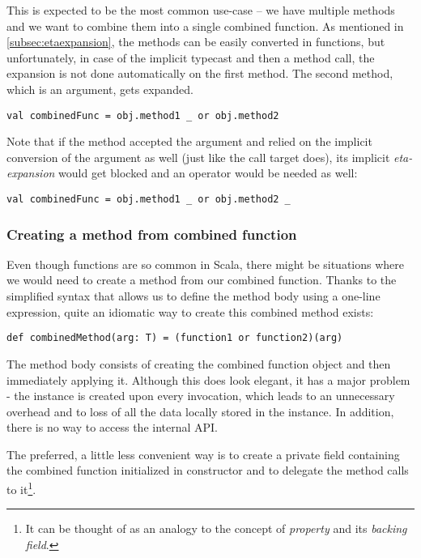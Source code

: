 This is expected to be the most common use-case -- we have multiple methods and we want to combine them into a single combined function. As mentioned in \ref{subsec:etaexpansion}, the methods can be easily converted in functions, but unfortunately, in case of the implicit typecast and then a method call, the expansion is not done automatically on the first method. The second method, which is an argument, gets expanded.

\lstset{style=Scala}
\begin{lstlisting}
val combinedFunc = obj.method1 _ or obj.method2
\end{lstlisting}

Note that if the  method accepted the  argument and relied on the implicit conversion of the argument as well (just like the call target does), its implicit \textit{eta-expansion} would get blocked and an operator \inlinecode{\_} would be needed as well:

\lstset{style=Scala}
\begin{lstlisting}
val combinedFunc = obj.method1 _ or obj.method2 _
\end{lstlisting}

\subsubsection{Creating a method from combined function}
\label{subsubsec:method_from_combined_func}

Even though functions are so common in Scala, there might be situations where we would need to create a method from our combined function. Thanks to the simplified syntax that allows us to define the method body using a one-line expression, quite an idiomatic way to create this combined method exists:

\lstset{style=Scala}
\begin{lstlisting}
def combinedMethod(arg: T) = (function1 or function2)(arg)
\end{lstlisting}

The method body consists of creating the combined function object and then immediately applying it. Although this does look elegant, it has a major problem - the  instance is created upon every invocation, which leads to an unnecessary overhead and to loss of all the data locally stored in the instance. In addition, there is no way to access the  internal API.

The preferred, a little less convenient way is to create a private field containing the combined function initialized in constructor and to delegate the method calls to it\footnote{It can be thought of as an analogy to the concept of \textit{property} and its \textit{backing field}.}.
 

